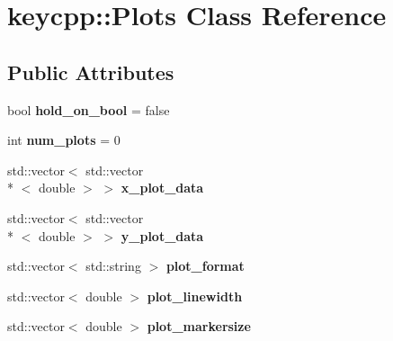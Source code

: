 \hypertarget{classkeycpp_1_1_plots}{\section{keycpp\-:\-:Plots Class Reference}
\label{classkeycpp_1_1_plots}
}
\subsection*{Public Attributes}
\begin{DoxyCompactItemize}
\item 
\hypertarget{classkeycpp_1_1_plots_afe961c1f35d88bc181bd426fc47ade00}{bool {\bfseries hold\-\_\-on\-\_\-bool} = false}\label{classkeycpp_1_1_plots_afe961c1f35d88bc181bd426fc47ade00}

\item 
\hypertarget{classkeycpp_1_1_plots_aa37e3813d1a29d423700af686dc1bf09}{int {\bfseries num\-\_\-plots} = 0}\label{classkeycpp_1_1_plots_aa37e3813d1a29d423700af686dc1bf09}

\item 
\hypertarget{classkeycpp_1_1_plots_a9de0b584d162d6694ea4281cb9a4396d}{std\-::vector$<$ std\-::vector\\*
$<$ double $>$ $>$ {\bfseries x\-\_\-plot\-\_\-data}}\label{classkeycpp_1_1_plots_a9de0b584d162d6694ea4281cb9a4396d}

\item 
\hypertarget{classkeycpp_1_1_plots_a3f3f95d6306139576d53734972995720}{std\-::vector$<$ std\-::vector\\*
$<$ double $>$ $>$ {\bfseries y\-\_\-plot\-\_\-data}}\label{classkeycpp_1_1_plots_a3f3f95d6306139576d53734972995720}

\item 
\hypertarget{classkeycpp_1_1_plots_a462b8a89f01d8beb747ec82a85530e3a}{std\-::vector$<$ std\-::string $>$ {\bfseries plot\-\_\-format}}\label{classkeycpp_1_1_plots_a462b8a89f01d8beb747ec82a85530e3a}

\item 
\hypertarget{classkeycpp_1_1_plots_a3d01b697171789f31c7e77764c905216}{std\-::vector$<$ double $>$ {\bfseries plot\-\_\-linewidth}}\label{classkeycpp_1_1_plots_a3d01b697171789f31c7e77764c905216}

\item 
\hypertarget{classkeycpp_1_1_plots_ad801040d683566ecf22c3c1ec72e6811}{std\-::vector$<$ double $>$ {\bfseries plot\-\_\-markersize}}\label{classkeycpp_1_1_plots_ad801040d683566ecf22c3c1ec72e6811}


\end{DoxyCompactItemize}
